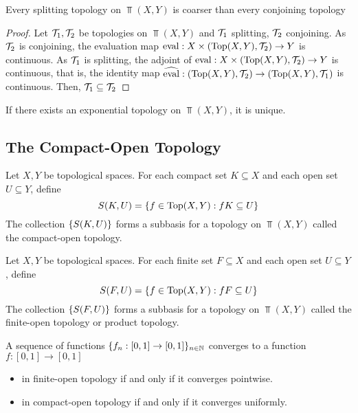 \documentclass{article}
\begin{document}
\begin{lemma}
    Every splitting topology on $\Top(X, Y)$ is coarser than every conjoining topology
\end{lemma}

\begin{proof}
    Let $\mathcal{T}_1, \mathcal{T}_2$ be topologies on $\Top(X, Y)$ and $\mathcal{T}_1$ splitting, $\mathcal{T}_2$ conjoining. As $\mathcal{T}_2$ is conjoining, the evaluation map $\operatorname{eval}: X \times (\operatorname{Top}(X, Y), \mathcal{T}_2) \to Y$ is continuous. As $\mathcal{T}_1$ is splitting, the adjoint of $\operatorname{eval}: X \times (\operatorname{Top}(X, Y), \mathcal{T}_2) \to Y$ is continuous, that is, the identity map $\widehat{\operatorname{eval}}: (\operatorname{Top}(X, Y), \mathcal{T}_2) \to (\operatorname{Top}(X, Y), \mathcal{T}_1)$ is continuous. Then, $\mathcal{T}_1 \subseteq \mathcal{T}_2$
\end{proof}

\begin{theorem}
    If there exists an exponential topology on $\Top(X, Y)$, it is unique.
\end{theorem}

\subsection{The Compact-Open Topology}

\begin{definition}
    Let $X, Y$ be topological spaces. For each compact set $K \subseteq X$ and each open set $U \subseteq Y$, define
    $$
        S(K, U) = \{f \in \operatorname{Top}(X, Y): fK \subseteq U\}
    $$
    The collection $\{S(K, U)\}$ forms a subbasis for a topology on $\Top(X, Y)$ called the compact-open topology.
\end{definition}

\begin{definition}
    Let $X, Y$ be topological spaces. For each finite set $F \subseteq X$ and each open set $U \subseteq Y$, define
    $$
        S(F, U) = \{f \in \operatorname{Top}(X, Y): fF \subseteq U\}
    $$
    The collection $\{S(F, U)\}$ forms a subbasis for a topology on $\Top(X, Y)$ called the finite-open topology or product topology.
\end{definition}

\begin{remark}
    A sequence of functions $\{f_n: [0, 1] \to [0, 1]\}_{n \in \mathbb{N}}$ converges to a function $f: [0, 1] \to [0, 1]$
    \begin{itemize}
        \item in finite-open topology if and only if it converges pointwise.
        \item in compact-open topology if and only if it converges uniformly.
    \end{itemize}
\end{remark}
\end{document}
